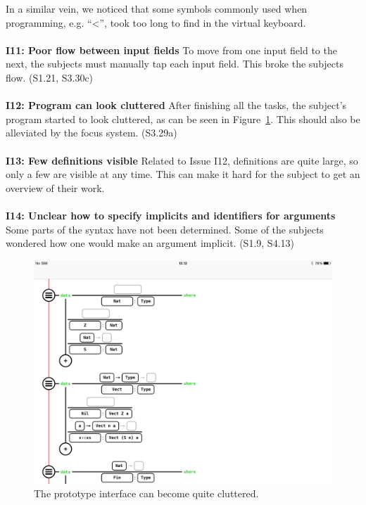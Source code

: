 In a similar vein, we noticed that some symbols commonly used when programming,
e.g. ``<'', took too long to find in the virtual keyboard.
\\ \\
\textbf{I11: Poor flow between input fields}
To move from one input field to the next, the subjects must manually tap each
input field. This broke the subjects flow. (S1.21, S3.30c)
\\ \\
\textbf{I12: Program can look cluttered}
After finishing all the tasks, the subject's program started to look cluttered, as can be seen in Figure~\ref{fig:clutteredInterface}.
This should also be alleviated by the focus system. (S3.29a)
\\ \\
\textbf{I13: Few definitions visible}
Related to Issue I12, definitions are quite large, so only a few are visible at
any time. This can make it hard for the subject to get an overview of their
work.
\\ \\
\textbf{I14: Unclear how to specify implicits and identifiers for arguments}
Some parts of the syntax have not been determined. Some of the subjects
wondered how one would make an argument implicit. (S1.9, S4.13)

\begin{figure}[h]
	\centering
		\includegraphics[width=\linewidth]{diagrams/cluttered_example.PNG}
	\caption{The prototype interface can become quite cluttered.}
\label{fig:clutteredInterface}
\end{figure}

